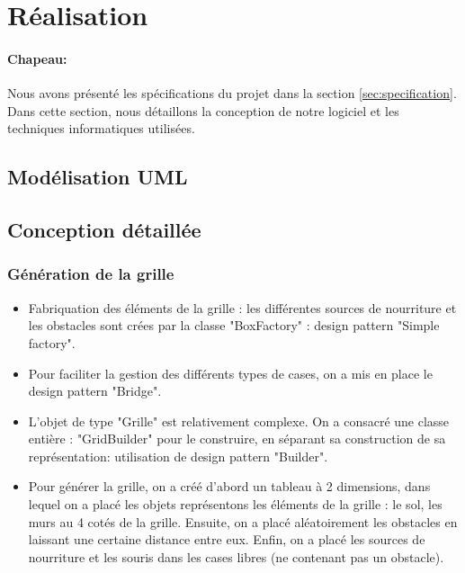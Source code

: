 \section{Réalisation}
\label{sec:impl}

\paragraph{Chapeau:} Nous avons présenté les spécifications du projet dans la section \ref{sec:specification}. Dans cette section, nous détaillons la conception de notre logiciel et les techniques informatiques utilisées.
\subsection{Modélisation UML}

\subsection{Conception détaillée}

\subsubsection{Génération de la grille}
\begin{itemize}
\item Fabriquation des éléments de la grille : les différentes sources de nourriture et les obstacles sont crées par la classe "BoxFactory" : design pattern "Simple factory".
\item Pour faciliter la gestion des différents types de cases, on a mis en place le design pattern "Bridge".
\item L'objet de type "Grille" est relativement complexe. On a consacré une classe entière : "GridBuilder" pour le construire, en séparant sa construction de sa représentation: utilisation de design pattern "Builder".
\item Pour générer la grille, on a créé d'abord un tableau à 2 dimensions, dans lequel on a placé les objets représentons les éléments de la grille : le sol, les murs au 4 cotés de la grille. Ensuite, on a placé aléatoirement les obstacles en laissant une certaine distance entre eux. Enfin, on a placé les sources de nourriture et les souris dans les cases libres (ne contenant pas un obstacle). 
\end{itemize}

